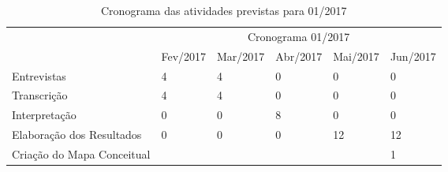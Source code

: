 \begin{table}[!htpb]
	\centering
	\begin{small} 
		\begin{tabular}{|p{5cm}|p{2cm}|p{2cm}|p{2cm}|p{2cm}|p{2cm}|}\hline
		 & \multicolumn{5}{c|}{Cronograma 01/2017}\\ \cline{2-6}
		\raisebox{1.5ex}{Entrevistas} & Fev/2017 & Mar/2017 & Abr/2017 & Mai/2017 & Jun/2017 \\ \hline
		Entrevistas   & 4 & 4 & 0 & 0 & 0 \\ \hline
		Transcrição   & 4 & 4 & 0 & 0 & 0 \\ \hline
		Interpretação & 0 & 0 & 8 & 0 & 0 \\ \hline
		Elaboração dos Resultados    & 0 & 0 & 0 & 12 & 12 \\ \hline
		Criação do Mapa Conceitual &   &   &   &   & 1 \\ \hline
		\end{tabular} 
	\end{small}
	\caption{Cronograma das atividades previstas para 01/2017}
	\label{t_cronograma}
\end{table} 